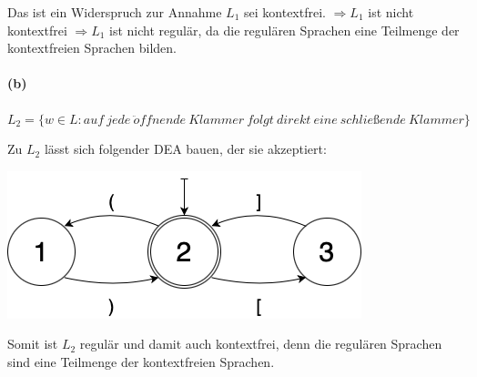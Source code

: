 	Das ist ein Widerspruch zur Annahme $L_1$ sei kontextfrei. $\Rightarrow L_1$ ist nicht kontextfrei $\Rightarrow L_1$ ist nicht regulär, da die regulären Sprachen eine Teilmenge der kontextfreien Sprachen bilden. 

	\vspace{0.3cm}
\paragraph{(b)}
	$L_2 = \{ w \in L: auf\ jede\ \ddot{o}ffnende\ Klammer\ folgt\ direkt\ eine\ schließende\ Klammer \}$
	
	Zu $L_2$ lässt sich folgender DEA bauen, der sie akzeptiert:
	\begin{center}
		\includegraphics[scale=0.5]{DEA zu Klammersprache.png}	
	\end{center}
	
	Somit ist $L_2$ regulär und damit auch kontextfrei, denn die regulären Sprachen sind eine Teilmenge der kontextfreien Sprachen.
	